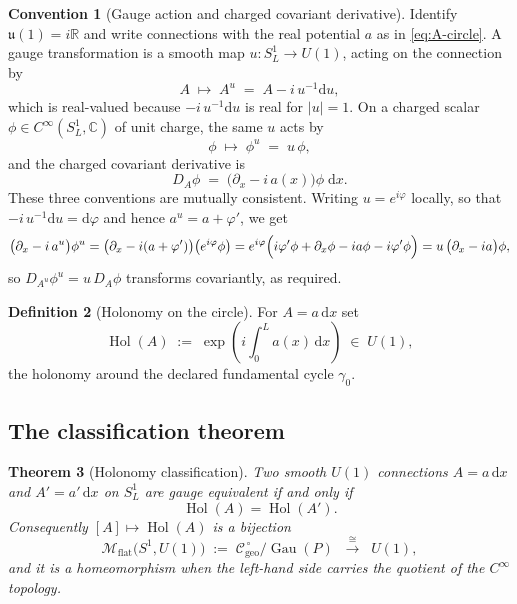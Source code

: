 \documentclass[11pt,a4paper]{article}
\theoremstyle{plain}
\newtheorem{theorem}{Theorem}[section]
\theoremstyle{definition}
\newtheorem{definition}[theorem]{Definition}
\newtheorem{convention}[theorem]{Convention}
\theoremstyle{remark}
\newcommand{\Real}{\mathbb{R}}
\newcommand{\Cx}{\mathbb{C}}
\newcommand{\Cgeo}{\mathcal{C}_{\mathrm{geo}}}
\newcommand{\Gau}{\operatorname{Gau}}
\newcommand{\Hol}{\operatorname{Hol}}
\newcommand{\Mflat}{\mathcal{M}_{\mathrm{flat}}}
\begin{document}
\begin{convention}[Gauge action and charged covariant derivative]
\label{conv:u1-norm}
Identify $\mathfrak{u}(1)=i\Real$ and write connections with the real potential $a$ as in
\eqref{eq:A-circle}. A gauge transformation is a smooth map $u\colon S^1_L\to U(1)$, acting on the
connection by
\begin{equation}
\label{eq:u1-gauge}
A\;\longmapsto\;A^{u}\;=\;A-i\,u^{-1}\mathrm{d}u ,
\end{equation}
which is real-valued because $-i\,u^{-1}\mathrm{d}u$ is real for $|u|=1$. On a charged scalar
$\phi\in C^\infty(S^1_L,\Cx)$ of unit charge, the same $u$ acts by
\begin{equation}
\label{eq:u1-matter}
\phi\;\longmapsto\;\phi^{u}\;=\;u\,\phi ,
\end{equation}
and the charged covariant derivative is
\begin{equation}
\label{eq:u1-covder}
D_A\phi\;=\;\bigl(\partial_x - i\,a(x)\bigr)\phi\;\mathrm{d}x .
\end{equation}
These three conventions are mutually consistent. Writing $u=e^{i\varphi}$ locally, so that
$-i\,u^{-1}\mathrm{d}u=\mathrm{d}\varphi$ and hence $a^{u}=a+\varphi'$, we get
\[
\bigl(\partial_x-i\,a^{u}\bigr)\phi^{u}
=\bigl(\partial_x - i(a+\varphi')\bigr)\bigl(e^{i\varphi}\phi\bigr)
= e^{i\varphi}\Bigl(i\varphi'\phi+\partial_x\phi - i a\phi - i\varphi'\phi\Bigr)
= u\,\bigl(\partial_x - ia\bigr)\phi ,
\]
so $D_{A^u}\phi^{u}=u\,D_A\phi$ transforms covariantly, as required.
\end{convention}

\begin{definition}[Holonomy on the circle]
\label{def:hol-circle}
For $A=a\,\mathrm{d}x$ set
\begin{equation}
\label{eq:hol-circle}
\Hol(A)\;:=\;\exp\!\left(i\int_0^L a(x)\,\mathrm{d}x\right)\;\in\;U(1),
\end{equation}
the holonomy around the declared fundamental cycle $\gamma_0$.
\end{definition}

\subsection{The classification theorem}

\begin{theorem}[Holonomy classification]
\label{thm:hol-class}
Two smooth $U(1)$ connections $A=a\,\mathrm{d}x$ and $A'=a'\,\mathrm{d}x$ on $S^1_L$ are gauge
equivalent if and only if
\begin{equation}
\label{eq:hol-equal}
\Hol(A)=\Hol(A') .
\end{equation}
Consequently $[A]\mapsto\Hol(A)$ is a bijection
\begin{equation}
\label{eq:moduli}
\Mflat\bigl(S^1,U(1)\bigr)
\;:=\;
\Cgeo^{\,\circ}/\Gau(P)
\;\;\xrightarrow{\ \cong\ }\;\;
U(1),
\end{equation}
and it is a homeomorphism when the left-hand side carries the quotient of the $C^\infty$ topology.
\end{theorem}
\end{document}
